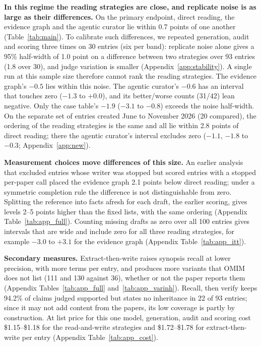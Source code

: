 \documentclass{article} %
\begin{document}
\textbf{In this regime the reading strategies are close, and replicate noise is as large as their differences.} On the primary endpoint, direct reading, the evidence graph and the agentic curator lie within 0.7 points of one another (Table~\ref{tab:main}). To calibrate such differences, we repeated generation, audit and scoring three times on 30 entries (six per band): replicate noise alone gives a 95\% half-width of 1.0 point on a difference between two strategies over 93 entries (1.8 over 30), and judge variation is smaller (Appendix~\ref{app:stability}). A single run at this sample size therefore cannot rank the reading strategies. The evidence graph's $-0.5$ lies within this noise. The agentic curator's $-0.6$ has an interval that touches zero ($-1.3$ to $+0.0$), and its better/worse counts (31/42) lean negative. Only the case table's $-1.9$ ($-3.1$ to $-0.8$) exceeds the noise half-width. On the separate set of entries created June to November 2026 (20 compared), the ordering of the reading strategies is the same and all lie within 2.8 points of direct reading; there the agentic curator's interval excludes zero ($-1.1$, $-1.8$ to $-0.3$; Appendix~\ref{app:new}).

\textbf{Measurement choices move differences of this size.} An earlier analysis that excluded entries whose writer was stopped but scored entries with a stopped per-paper call placed the evidence graph 2.1 points below direct reading; under a symmetric completion rule the difference is not distinguishable from zero. Splitting the reference into facts afresh for each draft, the earlier scoring, gives levels 2--5 points higher than the fixed lists, with the same ordering (Appendix Table~\ref{tab:app_full}). Counting missing drafts as zero over all 100 entries gives intervals that are wide and include zero for all three reading strategies, for example $-3.0$ to $+3.1$ for the evidence graph (Appendix Table~\ref{tab:app_itt}).

\textbf{Secondary measures.} Extract-then-write raises synopsis recall at lower precision, with more terms per entry, and produces more variants that OMIM does not list (111 and 130 against 36), whether or not the paper reports them (Appendix Tables~\ref{tab:app_full} and~\ref{tab:app_varinh}). Recall, then verify keeps 94.2\% of claims judged supported but states no inheritance in 22 of 93 entries; since it may not add content from the papers, its low coverage is partly by construction. At list price for this one model, generation, audit and scoring cost \$1.15--\$1.18 for the read-and-write strategies and \$1.72--\$1.78 for extract-then-write per entry (Appendix Table~\ref{tab:app_cost}).
\end{document}

